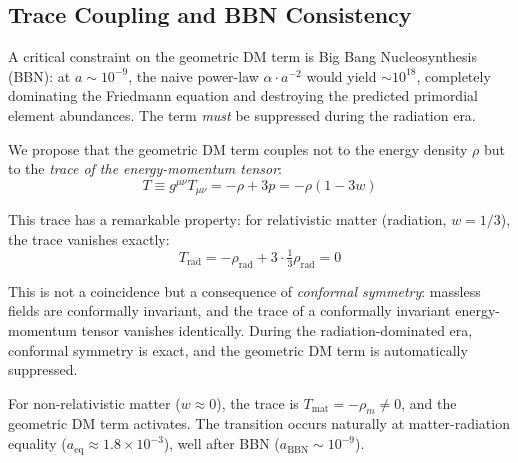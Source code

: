 \documentclass[aps,prd,twocolumn,superscriptaddress,nofootinbib]{revtex4-2}
\begin{document}
\subsection{Trace Coupling and BBN Consistency}
\label{subsec:trace_coupling}

A critical constraint on the geometric DM term is Big Bang Nucleosynthesis (BBN): at $a \sim 10^{-9}$, the naive power-law $\alpha \cdot a^{-2}$ would yield $\sim 10^{18}$, completely dominating the Friedmann equation and destroying the predicted primordial element abundances. The term \textit{must} be suppressed during the radiation era.

We propose that the geometric DM term couples not to the energy density $\rho$ but to the \textit{trace of the energy-momentum tensor}:
\begin{equation}
T \equiv g^{\mu\nu} T_{\mu\nu} = -\rho + 3p = -\rho(1 - 3w)
\end{equation}

This trace has a remarkable property: for relativistic matter (radiation, $w = 1/3$), the trace vanishes exactly:
\begin{equation}
T_{\mathrm{rad}} = -\rho_{\mathrm{rad}} + 3 \cdot \tfrac{1}{3}\rho_{\mathrm{rad}} = 0
\end{equation}

This is not a coincidence but a consequence of \textit{conformal symmetry}: massless fields are conformally invariant, and the trace of a conformally invariant energy-momentum tensor vanishes identically. During the radiation-dominated era, conformal symmetry is exact, and the geometric DM term is automatically suppressed.

For non-relativistic matter ($w \approx 0$), the trace is $T_{\mathrm{mat}} = -\rho_m \neq 0$, and the geometric DM term activates. The transition occurs naturally at matter-radiation equality ($a_{\mathrm{eq}} \approx 1.8 \times 10^{-3}$), well after BBN ($a_{\mathrm{BBN}} \sim 10^{-9}$).
\end{document}

